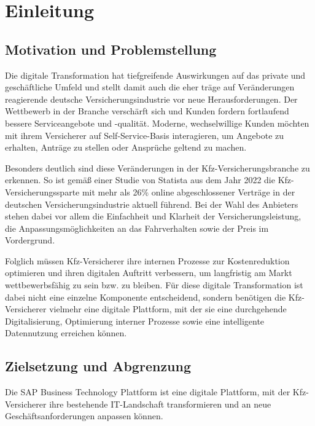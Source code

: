 \chapter{Einleitung}

\section{Motivation und Problemstellung}

Die digitale Transformation hat tiefgreifende Auswirkungen auf das private und geschäftliche Umfeld und stellt damit auch die eher träge auf Veränderungen reagierende deutsche Versicherungsindustrie vor neue Herausforderungen. Der Wettbewerb in der Branche verschärft sich und Kunden fordern fortlaufend bessere Serviceangebote und -qualität. Moderne, wechselwillige Kunden möchten mit ihrem Versicherer auf Self-Service-Basis interagieren, um Angebote zu erhalten, Anträge zu stellen oder Ansprüche geltend zu machen. \autocite[Vgl.][]{SCHMIDT2022}

Besonders deutlich sind diese Veränderungen in der Kfz-Versicherungsbranche zu erkennen. So ist gemäß einer Studie von Statista aus dem Jahr 2022 die Kfz-Versicherungssparte mit mehr als 26\% online abgeschlossener Verträge in der deutschen Versicherungsindustrie aktuell führend. \autocite[Vgl.][]{STATISTA2023} Bei der Wahl des Anbieters stehen dabei vor allem die Einfachheit und Klarheit der Versicherungsleistung, die Anpassungsmöglichkeiten an das Fahrverhalten sowie der Preis im Vordergrund. \autocite[Vgl.][]{MITZNER2023} 

Folglich müssen Kfz-Versicherer ihre internen Prozesse zur Kostenreduktion optimieren und ihren digitalen Auftritt verbessern, um langfristig am Markt wettbewerbsfähig zu sein bzw. zu bleiben. Für diese digitale Transformation ist dabei nicht eine einzelne Komponente entscheidend, sondern benötigen die Kfz-Versicherer vielmehr eine digitale Plattform, mit der sie eine durchgehende Digitalisierung, Optimierung interner Prozesse sowie eine intelligente Datennutzung erreichen können. \autocite[Vgl.][]{WEINGARTNER2023} 

\section{Zielsetzung und Abgrenzung}

Die SAP Business Technology Plattform ist eine digitale Plattform, mit der Kfz-Versicherer ihre bestehende IT-Landschaft transformieren und an neue Geschäftsanforderungen anpassen können.

